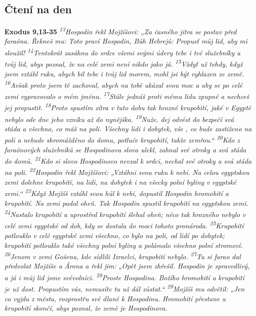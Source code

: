 \documentclass[11pt]{article}
\begin{document}
\subsection*{Čtení na den}
\textbf{Exodus 9,13-35}
\newline
\textit{
\textsuperscript{13}Hospodin řekl Mojžíšovi: „Za časného jitra se postav před faraóna. Řekneš mu: Toto praví Hospodin, Bůh Hebrejů: Propusť můj lid, aby mi sloužil!
\textsuperscript{14}Tentokrát zasáhnu do srdce všemi svými údery tebe i tvé služebníky a tvůj lid, abys poznal, že na celé zemi není nikdo jako já.
\textsuperscript{15}Vždyť už tehdy, když jsem vztáhl ruku, abych bil tebe i tvůj lid morem, mohl jsi být vyhlazen ze země.
\textsuperscript{16}Avšak proto jsem tě zachoval, abych na tobě ukázal svou moc a aby se po celé zemi vypravovalo o mém jménu.
\textsuperscript{17}Stále jednáš proti mému lidu zpupně a nechceš jej propustit.
\textsuperscript{18}Proto spustím zítra v tuto dobu tak hrozné krupobití, jaké v Egyptě nebylo ode dne jeho vzniku až do nynějška.
\textsuperscript{19}Nuže, dej odvést do bezpečí svá stáda a všechno, co máš na poli. Všechny lidi i dobytek, vše , co bude zastiženo na poli a nebude shromážděno do domu, potluče krupobití, takže zemřou.“
\textsuperscript{20}Kdo z faraónových služebníků se Hospodinova slova ulekl, zahnal své otroky a svá stáda do domů.
\textsuperscript{21}Kdo si slovo Hospodinovo nevzal k srdci, nechal své otroky a svá stáda na poli.
\textsuperscript{22}Hospodin řekl Mojžíšovi: „Vztáhni svou ruku k nebi. Na celou egyptskou zemi dolehne krupobití, na lidi, na dobytek i na všecky polní byliny v egyptské zemi.“
\textsuperscript{23}Když Mojžíš vztáhl svou hůl k nebi, dopustil Hospodin hromobití a krupobití. Na zemi padal oheň. Tak Hospodin spustil krupobití na egyptskou zemi.
\textsuperscript{24}Nastalo krupobití a uprostřed krupobití šlehal oheň; něco tak hrozného nebylo v celé zemi egyptské od dob, kdy se dostala do moci tohoto pronároda.
\textsuperscript{25}Krupobití potlouklo v celé egyptské zemi všechno, co bylo na poli, od lidí po dobytek; krupobití potlouklo také všechny polní byliny a polámalo všechno polní stromoví.
\textsuperscript{26}Jenom v zemi Gošenu, kde sídlili Izraelci, krupobití nebylo.
\textsuperscript{27}Tu si farao dal předvolat Mojžíše a Árona a řekl jim: „Opět jsem zhřešil. Hospodin je spravedlivý, a já i můj lid jsme svévolníci.
\textsuperscript{28}Proste Hospodina. Božího hromobití a krupobití je už dost. Propustím vás, nemusíte tu už dál zůstat.“
\textsuperscript{29}Mojžíš mu odvětil: „Jen co vyjdu z města, rozprostřu své dlaně k Hospodinu. Hromobití přestane a krupobití skončí, abys poznal, že země je Hospodinova.
}
\end{document}
